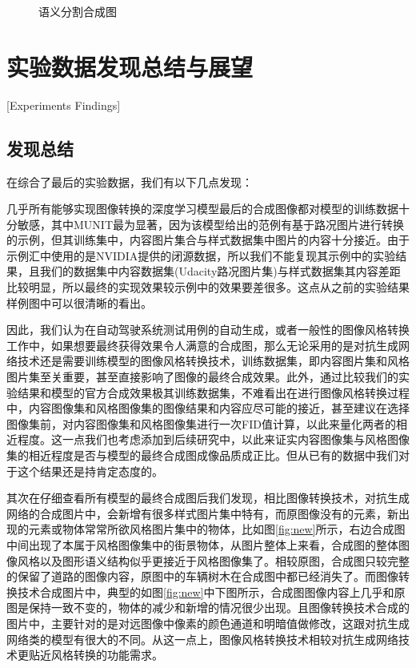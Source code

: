 \begin{figure}[h]
    \centering
    \caption{语义分割合成图}
    \label{fig:seg}
\end{figure}


\section{实验数据发现总结与展望}[Experiments Findings]

\subsection{发现总结}

在综合了最后的实验数据，我们有以下几点发现：

几乎所有能够实现图像转换的深度学习模型最后的合成图像都对模型的训练数据十分敏感，其中MUNIT最为显著，因为该模型给出的范例有基于路况图片进行转换的示例，但其训练集中，内容图片集合与样式数据集中图片的内容十分接近。由于示例汇中使用的是NVIDIA提供的闭源数据，所以我们不能复现其示例中的实验结果，且我们的数据集中内容数据集(Udacity路况图片集)与样式数据集其内容差距比较明显，所以最终的实现效果较示例中的效果要差很多。这点从之前的实验结果样例图中可以很清晰的看出。

因此，我们认为在自动驾驶系统测试用例的自动生成，或者一般性的图像风格转换工作中，如果想要最终获得效果令人满意的合成图，那么无论采用的是对抗生成网络技术还是需要训练模型的图像风格转换技术，训练数据集，即内容图片集和风格图片集至关重要，甚至直接影响了图像的最终合成效果。此外，通过比较我们的实验结果和模型的官方合成效果极其训练数据集，不难看出在进行图像风格转换过程中，内容图像集和风格图像集的图像结果和内容应尽可能的接近，甚至建议在选择图像集前，对内容图像集和风格图像集进行一次FID值计算，以此来量化两者的相近程度。这一点我们也考虑添加到后续研究中，以此来证实内容图像集与风格图像集的相近程度是否与模型的最终合成图成像品质成正比。但从已有的数据中我们对于这个结果还是持肯定态度的。

其次在仔细查看所有模型的最终合成图后我们发现，相比图像转换技术，对抗生成网络的合成图片中，会新增有很多样式图片集中特有，而原图像没有的元素，新出现的元素或物体常常所欲风格图片集中的物体，比如图\ref{fig:new}所示，右边合成图中间出现了本属于风格图像集中的街景物体，从图片整体上来看，合成图的整体图像风格以及图形语义结构似乎更接近于风格图像集了。相较原图，合成图只较完整的保留了道路的图像内容，原图中的车辆树木在合成图中都已经消失了。而图像转换技术合成图片中，典型的如图\ref{fig:new}中下图所示，合成图图像内容上几乎和原图是保持一致不变的，物体的减少和新增的情况很少出现。且图像转换技术合成的图片中，主要针对的是对远图像中像素的颜色通道和明暗值做修改，这跟对抗生成网络类的模型有很大的不同。从这一点上，图像风格转换技术相较对抗生成网络技术更贴近风格转换的功能需求。

